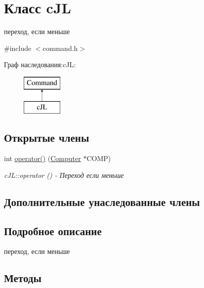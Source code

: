 \hypertarget{classc_j_l}{}\section{Класс c\+JL}
\label{classc_j_l}


переход, если меньше  




{\ttfamily \#include $<$command.\+h$>$}

Граф наследования\+:c\+JL\+:\begin{figure}[H]
\begin{center}
\leavevmode
\includegraphics[height=2.000000cm]{classc_j_l}
\end{center}
\end{figure}
\subsection*{Открытые члены}
\begin{DoxyCompactItemize}
\item 
int \hyperlink{classc_j_l_a55b58d0fbac469b387a2e6a4a31902bf}{operator()} (\hyperlink{class_computer}{Computer} $\ast$C\+O\+MP)
\begin{DoxyCompactList}\small\item\em c\+J\+L\+::operator () -\/ Переход если меньше \end{DoxyCompactList}\end{DoxyCompactItemize}
\subsection*{Дополнительные унаследованные члены}


\subsection{Подробное описание}
переход, если меньше 

\subsection{Методы}
\hypertarget{classc_j_l_a55b58d0fbac469b387a2e6a4a31902bf}{}\label{classc_j_l_a55b58d0fbac469b387a2e6a4a31902bf} 
